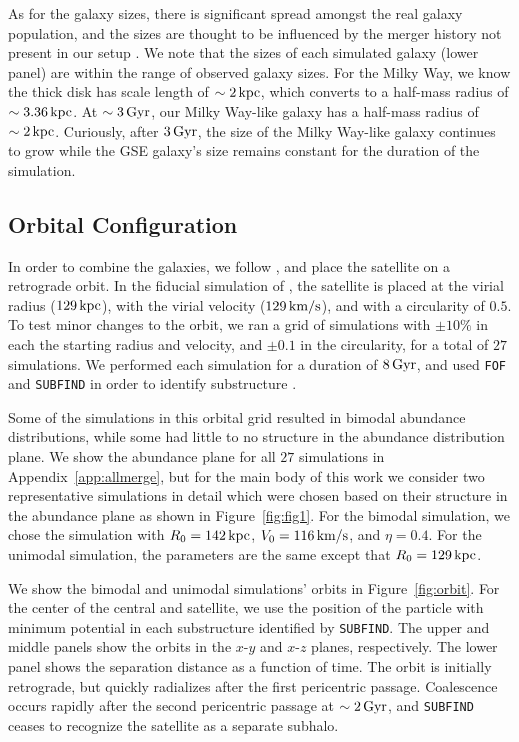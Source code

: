 As for the galaxy sizes, there is significant spread amongst the real galaxy population, and the sizes are thought to be influenced by the merger history not present in our setup \citep[e.g.][]{2014ApJ...788...28V}. We note that the sizes of each simulated galaxy (lower panel) are within the range of observed galaxy sizes. For the Milky Way, we know the thick disk has scale length of $\sim2\,\textrm{kpc}$, which converts to a half-mass radius of $\sim3.36\,\textrm{kpc}$. At $\sim3\,\textrm{Gyr}$, our Milky Way-like galaxy has a half-mass radius of $\sim2\,\textrm{kpc}$. Curiously, after $3\,\textrm{Gyr}$, the size of the Milky Way-like galaxy continues to grow while the GSE galaxy's size remains constant for the duration of the simulation.

\subsection{Orbital Configuration}\label{ssec:orbit_setup}
In order to combine the galaxies, we follow \citet{2021ApJ...923...92N}, and place the satellite on a retrograde orbit. In the fiducial simulation of \citet{2021ApJ...923...92N}, the satellite is placed at the virial radius ($129\,\textrm{kpc}$), with the virial velocity ($129\,\textrm{km}/\textrm{s}$), and with a circularity of $0.5$. To test minor changes to the orbit, we ran a grid of simulations with $\pm10\%$ in each the starting radius and velocity, and $\pm0.1$ in the circularity, for a total of $27$ simulations. We performed each simulation for a duration of $8\,\textrm{Gyr}$, and used \texttt{FOF} and \texttt{SUBFIND} in order to identify substructure \citep{2005Natur.435..629S,2009MNRAS.399..497D}.

Some of the simulations in this orbital grid resulted in bimodal abundance distributions, while some had little to no structure in the abundance distribution plane. We show the abundance plane for all $27$ simulations in Appendix~\ref{app:allmerge}, but for the main body of this work we consider two representative simulations in detail which were chosen based on their structure in the abundance plane as shown in Figure~\ref{fig:fig1}. For the bimodal simulation, we chose the simulation with $R_0=142\,\textrm{kpc}$, $V_0=116\,\textrm{km}/\textrm{s}$, and $\eta=0.4$. For the unimodal simulation, the parameters are the same except that $R_0=129\,\textrm{kpc}$.

We show the bimodal and unimodal simulations' orbits in Figure~\ref{fig:orbit}. For the center of the central and satellite, we use the position of the particle with minimum potential in each substructure identified by \texttt{SUBFIND}. The upper and middle panels show the orbits in the $x$-$y$ and $x$-$z$ planes, respectively. The lower panel shows the separation distance as a function of time. The orbit is initially retrograde, but quickly radializes after the first pericentric passage. Coalescence occurs rapidly after the second pericentric passage at $\sim2\,\textrm{Gyr}$, and \texttt{SUBFIND} ceases to recognize the satellite as a separate subhalo.

